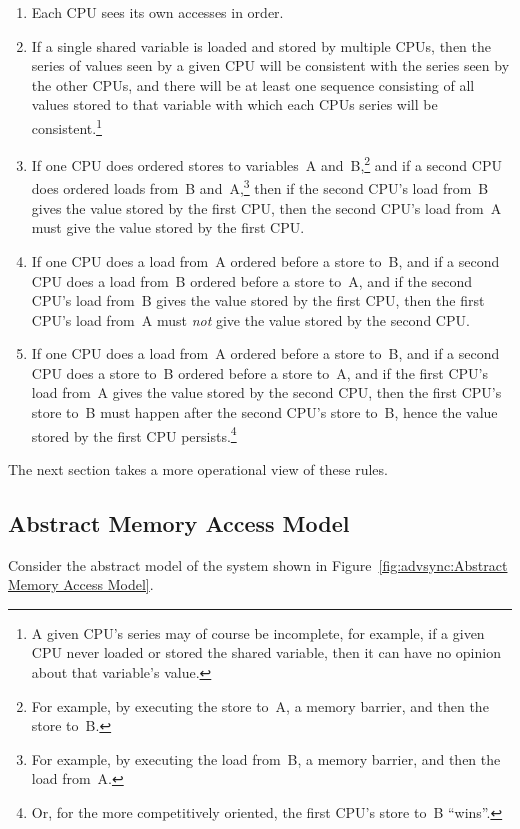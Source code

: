 \begin{enumerate}
\item	Each CPU sees its own accesses in order.
\item	If a single shared variable is loaded and stored by multiple
	CPUs, then the series of values seen by a given CPU will be
	consistent with the series seen by the other CPUs, and there
	will be at least one sequence consisting of all values stored
	to that variable with which each CPUs series will be
	consistent.\footnote{
		A given CPU's series may of course be incomplete,
		for example, if a given CPU never loaded or stored
		the shared variable, then it can have no opinion about
		that variable's value.}
\item	If one CPU does ordered stores to variables~A and~B,\footnote{
		For example, by executing the store to~A, a
		memory barrier, and then the store to~B.}
	and if a second CPU does ordered loads from~B and~A,\footnote{
		For example, by executing the load from~B, a
		memory barrier, and then the load from~A.}
	then if the second CPU's load from~B gives the value stored
	by the first CPU, then the second CPU's load from~A must
	give the value stored by the first CPU.
\item	If one CPU does a load from~A ordered before a store to~B,
	and if a second CPU does a load from~B ordered before a store to~A,
	and if the second CPU's load from~B gives the value stored by
	the first CPU, then the first CPU's load from~A must \emph{not}
	give the value stored by the second CPU.
\item	If one CPU does a load from~A ordered before a store to~B,
	and if a second CPU does a store to~B ordered before a
	store to~A, and if the first CPU's load from~A gives
	the value stored by the second CPU, then the first CPU's
	store to~B must happen after the second CPU's store to~B,
	hence the value stored by the first CPU persists.\footnote{
		Or, for the more competitively oriented, the first
		CPU's store to~B ``wins''.}
\end{enumerate}

The next section takes a more operational view of these rules.

\subsection{Abstract Memory Access Model}

Consider the abstract model of the system shown in
Figure~\ref{fig:advsync:Abstract Memory Access Model}.

